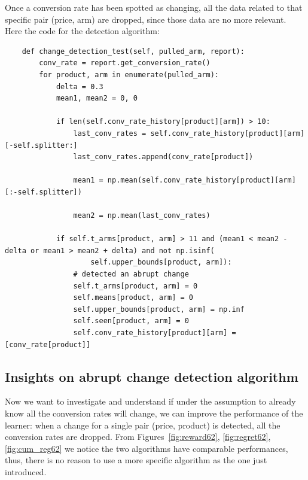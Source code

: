 Once a conversion rate has been spotted as changing, all the data related to that specific pair (price, arm) are dropped, since those data are no more relevant.\\
Here the code for the detection algorithm:
\begin{verbatim}
    def change_detection_test(self, pulled_arm, report):
        conv_rate = report.get_conversion_rate()
        for product, arm in enumerate(pulled_arm):
            delta = 0.3
            mean1, mean2 = 0, 0

            if len(self.conv_rate_history[product][arm]) > 10:
                last_conv_rates = self.conv_rate_history[product][arm][-self.splitter:]
                last_conv_rates.append(conv_rate[product])

                mean1 = np.mean(self.conv_rate_history[product][arm][:-self.splitter])

                mean2 = np.mean(last_conv_rates)

            if self.t_arms[product, arm] > 11 and (mean1 < mean2 - delta or mean1 > mean2 + delta) and not np.isinf(
                    self.upper_bounds[product, arm]):
                # detected an abrupt change
                self.t_arms[product, arm] = 0
                self.means[product, arm] = 0
                self.upper_bounds[product, arm] = np.inf
                self.seen[product, arm] = 0
                self.conv_rate_history[product][arm] = [conv_rate[product]]
\end{verbatim}
\subsection{Insights on abrupt change detection algorithm}
\label{learner1}
Now we want to investigate and understand if under the assumption to already know all the conversion rates will change, we can improve the performance of the learner: when a change for a single pair (price, product) is detected, all the conversion rates are dropped. From Figures~\ref{fig:reward62}, \ref{fig:regret62}, \ref{fig:cum_reg62} we notice the two algorithms have comparable performances, thus, there is no reason to use a more specific algorithm as the one just introduced.

